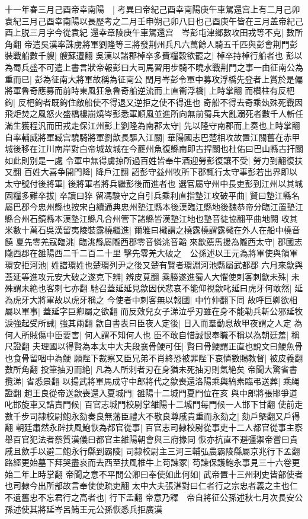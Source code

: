 十一年春三月己酉帝幸南陽　|{
	考異曰帝紀己酉幸南陽庚午車駕還宫上有二月己卯袁紀三月己酉幸南陽以長歷考之二月壬申朔己卯八日也己酉庚午皆在三月盖帝紀己酉上脱三月字今從袁紀}
還幸章陵庚午車駕還宫　岑彭屯津鄉數攻田戎等不克|{
	數所角翻}
帝遣吳漢率誅虜將軍劉隆等三將發荆州兵凡六萬餘人騎五千匹與彭會荆門彭裝戰船數千艘|{
	艘蘇遭翻}
吳漢以諸郡棹卒多費糧穀欲罷之|{
	棹卒持棹行船者也}
彭以為蜀兵盛不可遣上書言狀帝報彭曰大司馬習用步騎不曉水戰荆門之事一由征南公為重而已|{
	彭為征南大將軍故稱為征南公}
閏月岑彭令軍中募攻浮橋先登者上賞於是偏將軍魯奇應募而前時東風狂急魯奇船逆流而上直衝浮橋|{
	上時掌翻}
而櫕柱有反杷鉤|{
	反杷鉤者既鉤住敵船使不得退又逆拒之使不得進也}
奇船不得去奇乘埶殊死戰因飛炬焚之風怒火盛橋樓崩燒岑彭悉軍順風並進所向無前蜀兵大亂溺死者數千人斬任滿生獲程汎而田戎走保江州彭上劉隆為南郡太守|{
	先以隆守南郡而上奏也上時掌翻}
自率輔威將軍臧宫驍騎將軍劉歆長驅入江關|{
	華陽國志巴楚相攻故置江關舊在赤甲城後移在江川南岸對白帝城故城在今夔州魚復縣南即古捍關也杜佑曰巴山縣古扞關如此則别是一處}
令軍中無得虜掠所過百姓皆奉牛酒迎勞彭復讓不受|{
	勞力到翻復扶又翻}
百姓大喜争開門降|{
	降戶江翻}
詔彭守益州牧所下郡輒行太守事彭若出界即以太守號付後將軍|{
	後將軍者將兵繼彭後而進者也}
選官屬守州中長吏彭到江州以其城固糧多難卒拔|{
	卒讀曰猝}
留馮駿守之自引兵乘利直指墊江攻破平曲|{
	賢曰墊江縣名屬巴郡今忠州縣也按宋白續通典忠州墊江縣本後漢臨江縣地後魏恭帝分臨江置墊江縣合州石鏡縣本漢墊江縣凡合州管下諸縣皆漢墊江地也墊音徒協翻平曲地闕}
收其米數十萬石吳漢留夷陵裝露橈繼進|{
	爾雅曰檝謂之橈露橈謂露檝在外人在船中橈音饒}
夏先零羌寇臨洮|{
	臨洮縣屬隴西郡零音憐洮音韜}
來歙薦馬援為隴西太守|{
	郡國志隴西郡在雒陽西二千二百二十里}
擊先零羌大破之　公孫述以王元為將軍使與領軍環安拒河池|{
	姓譜環姓也楚環列尹之後又楚有賢者環淵河池縣屬武都郡}
六月來歙與蓋延等進攻元安大破之遂克下辨|{
	辨皮莧翻}
乘勝遂進蜀人大懼使刺客刺歙未殊|{
	未殊謂未絶也客刺七亦翻}
馳召蓋延延見歙因伏悲哀不能仰視歙叱延曰虎牙何敢然|{
	延為虎牙大將軍故以虎牙稱之}
今使者中刺客無以報國|{
	中竹仲翻下同}
故呼巨卿欲相屬以軍事|{
	蓋延字巨卿屬之欲翻}
而反效兒女子涕泣乎刃雖在身不能勒兵斬公邪延牧淚強起受所誡|{
	強其兩翻}
歙自書表曰臣夜人定後|{
	日入而羣動息故甲夜謂之人定}
為何人所賊傷中臣要害|{
	何人謂不知何人也}
臣不敢自惜誠恨奉職不稱以為朝廷羞|{
	稱尺證翻}
夫理國以得賢為本太中大夫段襄骨鯁可任|{
	賢曰骨鯁謂正直也說文曰鯁魚骨也食骨留咽中為鯁}
願陛下裁察又臣兄弟不肖終恐被罪陛下哀憐數賜教督|{
	被皮義翻數所角翻}
投筆抽刃而絶|{
	凡為人所刺者刃在身猶未死抽刃則氣絶矣}
帝聞大驚省書攬涕|{
	省悉景翻}
以揚武將軍馬成守中郎將代之歙喪還洛陽乘輿縞素臨弔送葬|{
	乘䋲證翻}
趙王良從帝送歙喪還入夏城門|{
	雒陽十二城門夏門位在亥}
與中郎將張邯爭道叱邯旋車又詰責門候|{
	百官志城門校尉掌雒陽十二城門每門候一人邯下甘翻}
使前走數千步司隸校尉鮑永劾奏良無藩臣禮大不敬良尊戚貴重而永劾之|{
	劾戶槩翻又戶得翻}
朝廷肅然永辟扶風鮑恢為都官從事|{
	百官志司隸校尉從事吏十二人都官從事主察舉百官犯法者蔡質漢儀曰都官主雒陽朝會與三府掾同}
恢亦抗直不避彊禦帝嘗曰貴戚且歛手以避二鮑永行縣到霸陵|{
	司隸校尉主三河三輔弘農霸陵縣屬京兆行下孟翻}
路經更始墓下拜哭盡哀而去西至扶風椎牛上苟諫冢|{
	苟諫保護鮑永事見三十六卷更始二年上時掌翻}
帝聞之意不平問公卿曰奉使如此何如|{
	武帝置十三州刺史皆部使者也司隸今出所部故言奉使使疏吏翻}
太中大夫張湛對曰仁者行之宗忠者義之主也仁不遺舊忠不忘君行之高者也|{
	行下孟翻}
帝意乃釋　帝自將征公孫述秋七月次長安公孫述使其將延岑呂鮪王元公孫恢悉兵拒廣漢

